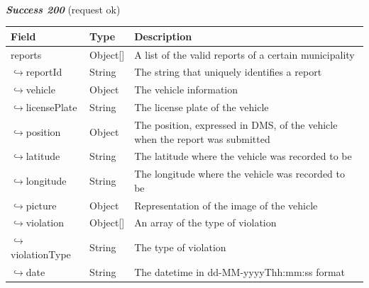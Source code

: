 						\paragraph{}
							\textcolor{myGreen}{\textit{\textbf{Success 200}}} (request ok)
							\vspace{-2mm}
							\begin{table}[!h]
								\begin{tabular}{L{0.3\textwidth}L{0.15\textwidth}L{0.43\textwidth}}
									\toprule
									\textbf{Field} & \textbf{Type} & \textbf{Description} \\
									\midrule
									reports & Object[] & A list of the valid reports of a certain municipality \\
									\hspace{2.5mm}$\hookrightarrow$reportId & String & The string that uniquely identifies a report \\
									\hspace{2.5mm}$\hookrightarrow$vehicle & Object & The vehicle information \\
									\hspace{6.5mm}$\hookrightarrow$licensePlate & String & The license plate of the vehicle \\
									\hspace{2.5mm}$\hookrightarrow$position & Object & The position, expressed in DMS, of the vehicle when the report was submitted  \\
									\hspace{6.5mm}$\hookrightarrow$latitude & String & The latitude where the vehicle was recorded to be \\
									\hspace{6.5mm}$\hookrightarrow$longitude & String & The longitude where the vehicle was recorded to be \\
									\hspace{2.5mm}$\hookrightarrow$picture & Object & Representation of the image of the vehicle \\
									\hspace{2.5mm}$\hookrightarrow$violation & Object[] & An array of the type of violation \\
									\hspace{6.5mm}$\hookrightarrow$violationType & String & The type of violation \\
									\hspace{2.5mm}$\hookrightarrow$date & String & The datetime in \newline dd-MM-yyyyThh:mm:ss format \\
								 	\bottomrule
								\end{tabular}
							\end{table}
